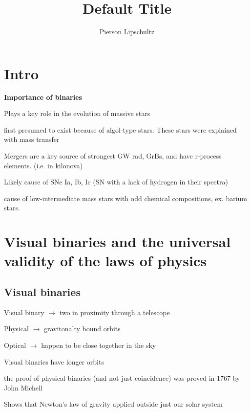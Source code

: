 \documentclass{article}
\title{Default Title}
\author{Pierson Lipschultz}
\begin{document}
\tableofcontents

\section{Intro}
\noindent \textbf{\large Importance of binaries}
\begin{list}{-}{}
\item Plays a key role in the evolution of massive stars
\item first presumed to exist because of \gls{algol-type} stars. These stars were explained with mass transfer
\item Mergers are a key source of strongest GW rad, GrBs, and have r-process elements. (i.e. in \gls{kilonova}) 
\item Likely cause of SNe Ia, Ib, Ic (SN with a lack of hydrogen in their spectra) 
\item cause of low-intermediate mass stars with odd chemical compositions, ex. barium stars. 
\end{list}

\section{Visual binaries and the universal validity of the laws of physics}

\subsection{Visual binaries}
\begin{list}{-}{}

\item Visual binary \(\rightarrow\) two in proximity through a telescope

\item Physical \(\rightarrow\) gravitonalty bound orbits

\item Optical \(\rightarrow\) happen to be close together in the sky

\end{list}

\begin{list}{-}{}
\item Visual binaries have longer orbits
\item the proof of physical binaries (and not just coincidence) was proved in 1767 by John Michell
\item Shows that Newton's law of gravity applied outside just our solar system
\end{list}
\end{document}
